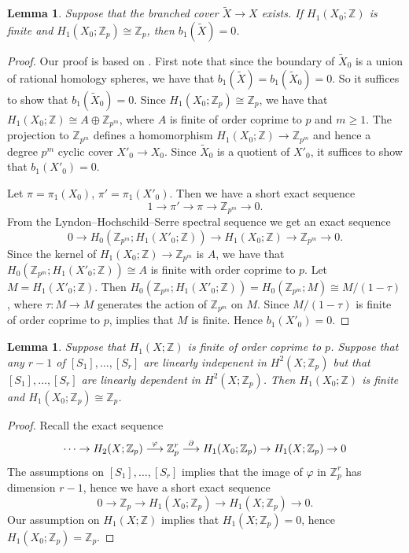 \documentclass{amsart}
\newtheorem{lemma}[theorem]{Lemma}
\theoremstyle{definition}
\theoremstyle{remark}
\numberwithin{equation}{section}
\begin{document}
\begin{lemma}\label{lem:b10}
Suppose that the branched cover $\widetilde{X} \to X$ exists. If $H_1(X_0 ; \mathbb{Z})$ is finite and $H_1(X_0 ; \mathbb{Z}_p) \cong \mathbb{Z}_p$, then $b_1(\widetilde{X}) = 0$.
\end{lemma}
\begin{proof}
Our proof is based on \cite[]{rok}. First note that since the boundary of $\widetilde{X}_0$ is a union of rational homology spheres, we have that $b_1(\widetilde{X}) = b_1(\widetilde{X}_0) = 0$. So it suffices to show that $b_1(\widetilde{X}_0) = 0$. Since $H_1(X_0 ; \mathbb{Z}_p) \cong \mathbb{Z}_p$, we have that $H_1(X_0 ; \mathbb{Z}) \cong A \oplus \mathbb{Z}_{p^m}$, where $A$ is finite of order coprime to $p$ and $m \ge 1$. The projection to $\mathbb{Z}_{p^m}$ defines a homomorphism $H_1(X_0 ; \mathbb{Z}) \to \mathbb{Z}_{p^m}$ and hence a degree $p^m$ cyclic cover $X'_0 \to X_0$. Since $\widetilde{X}_0$ is a quotient of $X'_0$, it suffices to show that $b_1(X'_0) = 0$.

Let $\pi = \pi_1(X_0)$, $\pi' = \pi_1(X'_0)$. Then we have a short exact sequence
\[
1 \to \pi' \to \pi \to \mathbb{Z}_{p^m} \to 0.
\]
From the Lyndon--Hochschild--Serre spectral sequence we get an exact sequence
\[
0 \to H_0( \mathbb{Z}_{p^m} ; H_1(X'_0 ; \mathbb{Z})) \to H_1(X_0 ; \mathbb{Z}) \to \mathbb{Z}_{p^m} \to 0.
\]
Since the kernel of $H_1(X_0 ; \mathbb{Z}) \to \mathbb{Z}_{p^m}$ is $A$, we have that $H_0( \mathbb{Z}_{p^m} ; H_1(X'_0 ; \mathbb{Z})) \cong A$ is finite with order coprime to $p$. Let $M = H_1(X'_0 ; \mathbb{Z})$. Then $H_0( \mathbb{Z}_{p^m} ; H_1(X'_0 ; \mathbb{Z})) = H_0( \mathbb{Z}_{p^m} ; M ) \cong M/(1-\tau)$, where $\tau : M \to M$ generates the action of $\mathbb{Z}_{p^m}$ on $M$. Since $M/(1-\tau)$ is finite of order coprime to $p$, \cite[Lemma 3.3]{rok} implies that $M$ is finite. Hence $b_1(X'_0) = 0$.
\end{proof}

\begin{lemma}\label{lem:1p}
Suppose that $H_1(X ; \mathbb{Z})$ is finite of order coprime to $p$. Suppose that any $r-1$ of $[S_1], \dots , [S_r]$ are linearly indepenent in $H^2(X ; \mathbb{Z}_p)$ but that $[S_1], \dots , [S_r]$ are linearly dependent in $H^2(X ; \mathbb{Z}_p)$. Then $H_1(X_0 ; \mathbb{Z})$ is finite and $H_1(X_0 ; \mathbb{Z}_p) \cong \mathbb{Z}_p$.
\end{lemma}
\begin{proof}
Recall the exact sequence
\[
\cdots \to H_2(X ; \mathbb{Z}_p) \buildrel \varphi \over \longrightarrow \mathbb{Z}^r_p \buildrel \partial \over \longrightarrow H_1(X_0 ; \mathbb{Z}_p) \to H_1(X ; \mathbb{Z}_p)  \to 0
\]
The assumptions on $[S_1], \dots , [S_r]$ implies that the image of $\varphi$ in $\mathbb{Z}_p^r$ has dimension $r-1$, hence we have a short exact sequence
\[
0 \to \mathbb{Z}_p \to H_1(X_0 ; \mathbb{Z}_p) \to H_1(X ; \mathbb{Z}_p)  \to 0.
\]
Our assumption on $H_1(X ; \mathbb{Z})$ implies that $H_1(X ; \mathbb{Z}_p) = 0$, hence $H_1(X_0 ; \mathbb{Z}_p) = \mathbb{Z}_p$. 
\end{proof}
\end{document}
